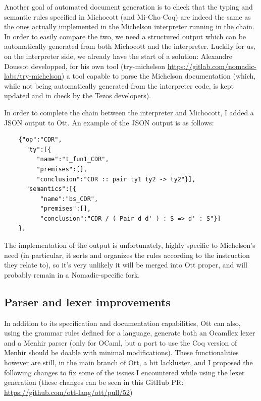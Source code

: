 \documentclass{report}
\begin{document}
Another goal of automated document generation is to check that the typing and semantic rules specified in Michocott (and Mi-Cho-Coq) are indeed the same as the ones actually implemented in the Michelson interpreter running in the chain. In order to easily compare the two, we need a structured output which can be automatically generated from both Michocott and the interpreter. Luckily for us, on the interpreter side, we already have the start of a solution: Alexandre Doussot developped, for his own tool (try-michelson \url{https://gitlab.com/nomadic-labs/try-michelson}) a tool capable to parse the Michelson documentation (which, while not being automatically generated from the interpreter code, is kept updated and in check by the Tezos developers).

In order to complete the chain between the interpreter and Michocott, I added a JSON output to Ott. An example of the JSON output is as follows:
\begin{verbatim}
    {"op":"CDR",
      "ty":[{
         "name":"t_fun1_CDR",
         "premises":[],
         "conclusion":"CDR :: pair ty1 ty2 -> ty2"}],
      "semantics":[{
          "name":"bs_CDR",
          "premises":[],
          "conclusion":"CDR / ( Pair d d' ) : S => d' : S"}]
    },
\end{verbatim}
The implementation of the output is unfortunately, highly specific to Michelson's need (in particular, it sorts and organizes the rules according to the instruction they relate to), so it's very unlikely it will be merged into Ott proper, and will probably remain in a Nomadic-specific fork.

\subsection{Parser and lexer improvements}
\label{parserLexerImprov}
In addition to its specification and documentation capabilities, Ott can also, using the grammar rules defined for a language, generate both an Ocamllex lexer and a Menhir parser (only for OCaml, but a port to use the Coq version of Menhir should be doable with minimal modifications). These functionalities however are still, in the main branch of Ott, a bit lackluster, and I proposed the following changes to fix some of the issues I encountered while using the lexer generation (these changes can be seen in this GitHub PR: \url{https://github.com/ott-lang/ott/pull/52})
\end{document}

